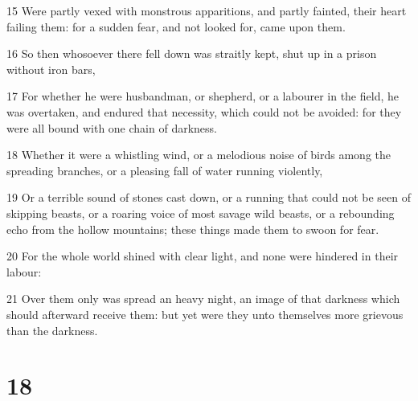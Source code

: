 \par 15 Were partly vexed with monstrous apparitions, and partly fainted, their heart failing them: for a sudden fear, and not looked for, came upon them.
\par 16 So then whosoever there fell down was straitly kept, shut up in a prison without iron bars,
\par 17 For whether he were husbandman, or shepherd, or a labourer in the field, he was overtaken, and endured that necessity, which could not be avoided: for they were all bound with one chain of darkness.
\par 18 Whether it were a whistling wind, or a melodious noise of birds among the spreading branches, or a pleasing fall of water running violently,
\par 19 Or a terrible sound of stones cast down, or a running that could not be seen of skipping beasts, or a roaring voice of most savage wild beasts, or a rebounding echo from the hollow mountains; these things made them to swoon for fear.
\par 20 For the whole world shined with clear light, and none were hindered in their labour:
\par 21 Over them only was spread an heavy night, an image of that darkness which should afterward receive them: but yet were they unto themselves more grievous than the darkness.

\chapter{18}

